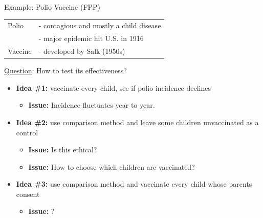 \documentclass[
  ignorenonframetext, 10pt
]{beamer}
\providecommand{\tightlist}{%
  \setlength{\itemsep}{0pt}\setlength{\parskip}{0pt}}
\begin{document}
\begin{frame}{Example: Polio Vaccine (FPP)}
\protect\hypertarget{example-polio-vaccine-fpp}{}
\begin{tabular}{@{}ll}
 Polio & - contagious and mostly a child disease \\
 & - major epidemic hit U.S. in 1916 \\
 Vaccine & - developed by Salk (1950s)
 \end{tabular}
 \vspace{0.17in}

\underline{Question}: How to test its effectiveness? \vspace{0.07in}
\pause

\begin{itemize}
\tightlist
\item
  \textbf{Idea \#1:} vaccinate every child, see if polio incidence
  declines

  \begin{itemize}
  \tightlist
  \item
    \textbf{Issue:} Incidence fluctuates year to year.\pause
  \end{itemize}
\item
  \textbf{Idea \#2: } use comparison method and leave some children
  unvaccinated as a control\pause

  \begin{itemize}
  \tightlist
  \item
    \textbf{Issue:} Is this ethical?
  \item
    \textbf{Issue:} How to choose which children are vaccinated?\pause
  \end{itemize}
\item
  \textbf{Idea \#3:} use comparison method and vaccinate every child
  whose parents consent\pause

  \begin{itemize}
  \tightlist
  \item
    \textbf{Issue:} ?
  \end{itemize}
\end{itemize}
\end{frame}
\end{document}

